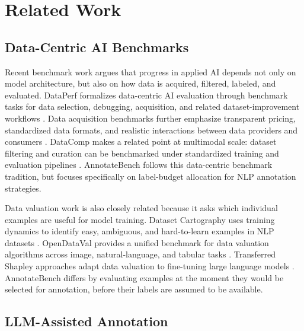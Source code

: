 \documentclass[11pt]{article}
\begin{document}
\section{Related Work}

\subsection{Data-Centric AI Benchmarks}

Recent benchmark work argues that progress in applied AI depends not only on model architecture, but also on how data is acquired, filtered, labeled, and evaluated. DataPerf formalizes data-centric AI evaluation through benchmark tasks for data selection, debugging, acquisition, and related dataset-improvement workflows \citep{mazumder2022dataperf}. Data acquisition benchmarks further emphasize transparent pricing, standardized data formats, and realistic interactions between data providers and consumers \citep{chen2023dataacquisition}. DataComp makes a related point at multimodal scale: dataset filtering and curation can be benchmarked under standardized training and evaluation pipelines \citep{gadre2023datacomp}. AnnotateBench follows this data-centric benchmark tradition, but focuses specifically on label-budget allocation for NLP annotation strategies.

Data valuation work is also closely related because it asks which individual examples are useful for model training. Dataset Cartography uses training dynamics to identify easy, ambiguous, and hard-to-learn examples in NLP datasets \citep{swayamdipta2020dataset}. OpenDataVal provides a unified benchmark for data valuation algorithms across image, natural-language, and tabular tasks \citep{jiang2023opendataval}. Transferred Shapley approaches adapt data valuation to fine-tuning large language models \citep{schoch2023dataselection}. AnnotateBench differs by evaluating examples at the moment they would be selected for annotation, before their labels are assumed to be available.

\subsection{LLM-Assisted Annotation}
\end{document}
